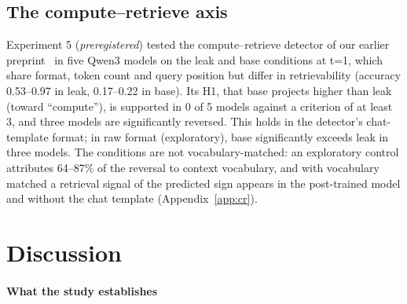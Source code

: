 \documentclass[11pt]{article}
\begin{document}
\subsection{The compute--retrieve axis}\label{sec:r-cr}

Experiment 5 (\emph{preregistered}) tested the compute--retrieve detector of our earlier preprint~\cite{ramdan2026cr} in five Qwen3 models on the leak and base conditions at t=1, which share format, token count and query position but differ in retrievability (accuracy 0.53--0.97 in leak, 0.17--0.22 in base). Its H1, that base projects higher than leak (toward ``compute''), is supported in 0 of 5 models against a criterion of at least 3, and three models are significantly reversed. This holds in the detector's chat-template format; in raw format (exploratory), base significantly exceeds leak in three models. The conditions are not vocabulary-matched: an exploratory control attributes 64--87\% of the reversal to context vocabulary, and with vocabulary matched a retrieval signal of the predicted sign appears in the post-trained model and without the chat template (Appendix~\ref{app:cr}).

\section{Discussion}\label{sec:discussion}

\paragraph{What the study establishes}
\end{document}
